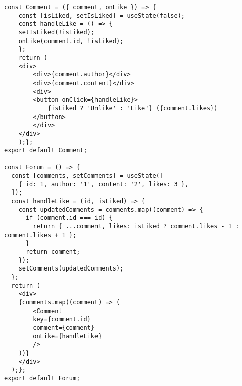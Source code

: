 \documentclass{article}
\begin{document}
\begin{lstlisting}[frame=single, basicstyle=\ttfamily, breaklines=true, breakatwhitespace=true, postbreak=\mbox{\textcolor{red}{$\hookrightarrow$}\space}]
const Comment = ({ comment, onLike }) => {
    const [isLiked, setIsLiked] = useState(false);
    const handleLike = () => {
    setIsLiked(!isLiked);
    onLike(comment.id, !isLiked);
    };
    return (
    <div>
        <div>{comment.author}</div>
        <div>{comment.content}</div>
        <div> 
        <button onClick={handleLike}>
            {isLiked ? 'Unlike' : 'Like'} ({comment.likes})
        </button>
        </div>
    </div>
    );};
export default Comment;

const Forum = () => {
  const [comments, setComments] = useState([
    { id: 1, author: '1', content: '2', likes: 3 },
  ]);
  const handleLike = (id, isLiked) => {
    const updatedComments = comments.map((comment) => {
      if (comment.id === id) {
        return { ...comment, likes: isLiked ? comment.likes - 1 : comment.likes + 1 };
      }
      return comment;
    });
    setComments(updatedComments);
  };
  return (
    <div>
    {comments.map((comment) => (
        <Comment
        key={comment.id}
        comment={comment}
        onLike={handleLike}
        />
    ))}
    </div>
  );};
export default Forum;
\end{lstlisting}
\end{document}
